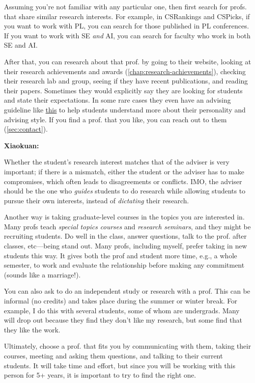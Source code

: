 \documentclass[oneside,11pt]{book}
\newenvironment{commentbox}[1][]{
  \small
  \begin{marker}[\faChessPawn{}]
    {\textbf{#1}}
  }{
  \end{marker}
}
\begin{document}
Assuming you're not familiar with any particular one, then first search for profs. that share similar research interests. For example, in CSRankings and CSPicks, if you want to work with PL, you can search for those published in PL conferences.  If you want to work with SE \emph{and} AI, you can search for faculty who work in both SE and AI.

After that, you can research about that prof. by going to their website, looking at their research achievements and awards (\autoref{chap:research-achievements}), checking their research lab and group, seeing if they have recent publications, and reading their papers.  Sometimes they would explicitly say they are looking for students and state their expectations. In some rare cases they even have an advising guideline like \href{https://roars.dev/phd-cs-us/advising.pdf}{this} to help students understand more about their personality and advising style.
If you find a prof. that you like, you can reach out to them (\autoref{sec:contact}).

\begin{commentbox}[Xiaokuan:]
  Whether the student's research interest matches that of the adviser is very important;
  if there is a mismatch,
  either the student or the adviser has to make compromises,
  which often leads to disagreements or conflicts.
  IMO, the adviser should be the one who \emph{guides}  students to do research while allowing students to pursue their own interests,
  instead of \emph{dictating} their research.
\end{commentbox}


Another way is taking graduate-level courses in the topics you are interested in.  Many profs teach \emph{special topics courses} and \emph{research seminars}, and they might be recruiting students. Do well in the class, answer questions, talk to the prof. after classes, etc---being stand out.  Many profs, including myself, prefer taking in new students this way.  It gives both the prof and student more time, e.g., a whole semester, to work and evaluate the relationship before making any commitment (sounds like a marriage!).

You can also ask to do an independent study or research with a prof. This can be informal (no credits) and takes place during the summer or winter break.  For example, I do this with several students, some of whom are undergrads. Many will drop out because they find they don't like my research, but some find that they like the work.

Ultimately, choose a prof. that fits you by communicating with them, taking their courses, meeting and asking them questions, and talking to their current students. It will take time and effort, but since you will be working with this person for 5+ years, it is important to try to find the right one.
\end{document}
